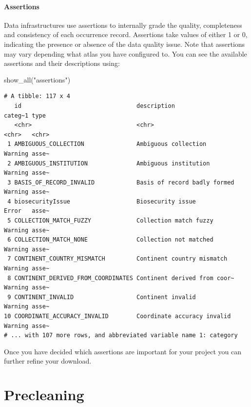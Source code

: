 \documentclass[
  letterpaper,
  DIV=11,
  numbers=noendperiod,
  oneside]{scrreprt}
\newenvironment{Shaded}{\begin{snugshade}}{\end{snugshade}}
\newcommand{\FunctionTok}[1]{\textcolor[rgb]{0.28,0.35,0.67}{#1}}
\newcommand{\NormalTok}[1]{\textcolor[rgb]{0.00,0.23,0.31}{#1}}
\newcommand{\StringTok}[1]{\textcolor[rgb]{0.13,0.47,0.30}{#1}}
\begin{document}
\hypertarget{assertions}{%
\subsubsection{Assertions}\label{assertions}}

Data infrastructures use assertions to internally grade the quality,
completeness and consistency of each occurrence record. Assertions take
values of either 1 or 0, indicating the presence or absence of the data
quality issue. Note that assertions may vary depending what atlas you
have configured to. You can see the available assertions and their
descriptions using:

\begin{Shaded}
\begin{Highlighting}[]
\FunctionTok{show\_all}\NormalTok{(}\StringTok{"assertions"}\NormalTok{) }
\end{Highlighting}
\end{Shaded}

\begin{verbatim}
# A tibble: 117 x 4
   id                                 description                  categ~1 type 
   <chr>                              <chr>                        <chr>   <chr>
 1 AMBIGUOUS_COLLECTION               Ambiguous collection         Warning asse~
 2 AMBIGUOUS_INSTITUTION              Ambiguous institution        Warning asse~
 3 BASIS_OF_RECORD_INVALID            Basis of record badly formed Warning asse~
 4 biosecurityIssue                   Biosecurity issue            Error   asse~
 5 COLLECTION_MATCH_FUZZY             Collection match fuzzy       Warning asse~
 6 COLLECTION_MATCH_NONE              Collection not matched       Warning asse~
 7 CONTINENT_COUNTRY_MISMATCH         Continent country mismatch   Warning asse~
 8 CONTINENT_DERIVED_FROM_COORDINATES Continent derived from coor~ Warning asse~
 9 CONTINENT_INVALID                  Continent invalid            Warning asse~
10 COORDINATE_ACCURACY_INVALID        Coordinate accuracy invalid  Warning asse~
# ... with 107 more rows, and abbreviated variable name 1: category
\end{verbatim}

Once you have decided which assertions are important for your project
you can further refine your download.


\hypertarget{precleaning}{%
\chapter{Precleaning}\label{precleaning}}
\end{document}

